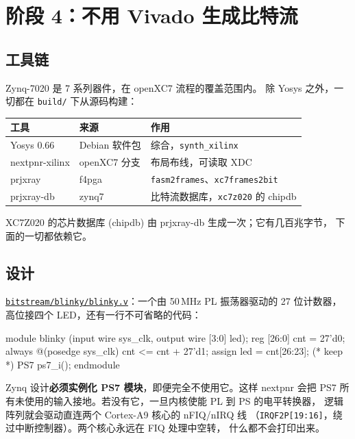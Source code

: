 \documentclass[11pt,a4paper,oneside]{article}
\newcommand{\file}[1]{{\color{bluemid}\nolinkurl{#1}}}
\newcommand{\cmd}[1]{\texttt{#1}}
\newcommand{\repo}{https://github.com/MaxClerkwell/ax7020-bringup}
\newcommand{\rfile}[1]{\href{\repo/blob/master/#1}{\color{bluemid}\nolinkurl{#1}}}
\begin{document}
\section{阶段 4：不用 Vivado 生成比特流}

\subsection{工具链}

Zynq-7020 是 7 系列器件，在 openXC7 流程的覆盖范围内。
除 Yosys 之外，一切都在 \file{build/} 下从源码构建：

\begin{center}\small
\begin{tabular}{@{}lll@{}}
\toprule
工具 & 来源 & 作用 \\
\midrule
Yosys 0.66 & Debian 软件包 & 综合，\cmd{synth\_xilinx} \\
nextpnr-xilinx & openXC7 分支 & 布局布线，可读取 XDC \\
prjxray & f4pga & \cmd{fasm2frames}、\cmd{xc7frames2bit} \\
prjxray-db & zynq7 & 比特流数据库，\cmd{xc7z020} 的 chipdb \\
\bottomrule
\end{tabular}
\end{center}

XC7Z020 的芯片数据库 (chipdb) 由 prjxray-db 生成一次；它有几百兆字节，
下面的一切都依赖它。

\subsection{设计}

\rfile{bitstream/blinky/blinky.v}：一个由 50\,MHz PL 振荡器驱动的 27 位计数器，
高位接四个 LED，还有一行不可省略的代码：

\begin{code}
module blinky (input wire sys_clk, output wire [3:0] led);
    reg [26:0] cnt = 27'd0;
    always @(posedge sys_clk) cnt <= cnt + 27'd1;
    assign led = cnt[26:23];
    (* keep *) PS7 ps7_i();
endmodule
\end{code}

\begin{mustknow}
Zynq 设计\textbf{必须实例化 PS7 模块}，即便完全不使用它。这样 nextpnr 会把
PS7 所有未使用的输入接地。若没有它，一旦内核使能 PL 到 PS 的电平转换器，
逻辑阵列就会驱动直连两个 Cortex-A9 核心的 nFIQ/nIRQ 线
（\cmd{IRQF2P[19:16]}，绕过中断控制器）。两个核心永远在 FIQ 处理中空转，
什么都不会打印出来。
\end{mustknow}
\end{document}
